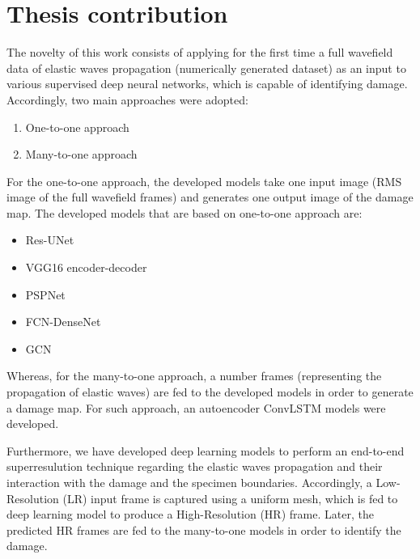 \section{Thesis contribution}
\label{sec14}
The novelty of this work consists of applying for the first time a full wavefield data of elastic waves propagation (numerically generated dataset) as an input to various supervised deep neural networks, which is capable of identifying damage.
Accordingly, two main approaches were adopted:
\begin{enumerate}
	\item One-to-one approach
	\item Many-to-one approach
\end{enumerate}

For the one-to-one approach, the developed models take one input image (RMS image of the full wavefield frames) and generates one output image of the damage map. 
The developed models that are based on one-to-one approach are:
\begin{itemize}
	\item Res-UNet
	\item VGG16 encoder-decoder
	\item PSPNet
	\item FCN-DenseNet
	\item GCN
\end{itemize}
Whereas, for the many-to-one approach, a number frames (representing the propagation of elastic waves) are fed to the developed models in order to generate a damage map.
For such approach, an autoencoder ConvLSTM models were developed.

Furthermore, we have developed deep learning models to perform an end-to-end superresulution technique regarding the elastic waves propagation and their interaction with the damage and the specimen boundaries.
Accordingly, a Low-Resolution (LR) input frame is captured using a uniform mesh, which is fed to deep learning model to produce a High-Resolution (HR) frame.
Later, the predicted HR frames are fed to the many-to-one models in order to identify the damage.